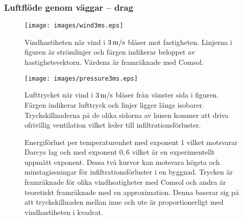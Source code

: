 \subsubsection{Luftflöde genom väggar – drag}

\begin{figure}[hpbt]
\centering
\texttt{[image: images/wind3ms.eps]}
\caption{Vindhastiheten när vind i $\unit[3]{ m/s}$ blåser mot fastigheten. Linjerna
i figuren är strömlinjer och färgen indikerar beloppet av hastighetsvektorn. Värdena är framräknade med Comsol.}
\end{figure}

\begin{figure}[hpbt]
\centering
\texttt{[image: images/pressure3ms.eps]}
\caption{Lufttrycket när vind i $\unit[3]{ m/s}$ blåser från vänster
sida i figuren. Färgen indikerar lufttryck och linjer ligger längs isobarer.
Tryckskillnaderna på de olika sidorna av husen kommer att driva ofrivillig ventilation vilket leder till infiltrationsförluster.}
\end{figure}


\begin{figure}[hpbt]
\centering
{}
\vspace{5mm}

\caption{Energiförlust per temperaturenhet med exponent 1 vilket motsvarar
Darcys lag och med exponent $0,6$ vilket är en experimentellt uppmätt
exponent. Dessa två kurvor kan motsvara högsta och minstagissningar för
infiltrationsförluster i en byggnad. Trycken är framräknade för olika
vindhsatigheter med Comsol och andra är teoretiskt framräknade med en approximation.
Denna baserar sig på att tryckskillnaden mellan inne och ute är proportionerligt
med vindhastiheten i kvadrat.}
\end{figure}
